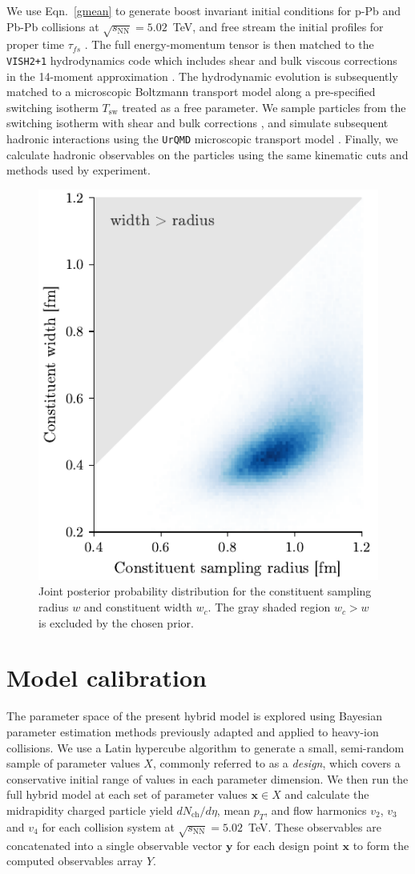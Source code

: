 \documentclass[3p,times,procedia,sort&compress]{elsarticle}
\newcommand{\sqrts}{\sqrt{s_\mathrm{NN}}}
\begin{document}
We use Eqn.~\eqref{gmean} to generate boost invariant initial conditions for p-Pb and Pb-Pb collisions at $\sqrts=5.02$~TeV, and free stream the initial profiles for proper time $\tau_{fs}$ \cite{Liu:2015nwa}.
The full energy-momentum tensor is then matched to the \texttt{VISH2+1} hydrodynamics code \cite{Song:2007ux, Shen:2014vra} which includes shear and bulk viscous corrections in the 14-moment approximation \cite{Bernhard:2016tnd}.
The hydrodynamic evolution is subsequently matched to a microscopic Boltzmann transport model along a pre-specified switching isotherm $T_\text{sw}$ treated as a free parameter.
We sample particles from the switching isotherm with shear and bulk corrections \cite{Bernhard:2018hnz}, and simulate subsequent hadronic interactions using the \texttt{UrQMD} microscopic transport model \cite{Bass:1998ca}.
Finally, we calculate hadronic observables on the particles using the same kinematic cuts and methods used by experiment.

\begin{figure}
  \includegraphics[width=.45\textwidth]{proton_posterior_shape}
  \caption{\label{fig:proton_shape} Joint posterior probability distribution for the constituent sampling radius $w$ and constituent width $w_c$. The gray shaded region $w_c > w$ is excluded by the chosen prior.}
\end{figure}

\section{Model calibration}

The parameter space of the present hybrid model is explored using Bayesian parameter estimation methods previously adapted and applied to heavy-ion collisions.
We use a Latin hypercube algorithm to generate a small, semi-random sample of parameter values $X$, commonly referred to as a \emph{design}, which covers a conservative initial range of values in each parameter dimension.
We then run the full hybrid model at each set of parameter values $\mathbf{x} \in X$ and calculate the midrapidity charged particle yield $dN_\text{ch}/d\eta$, mean $p_T$, and flow harmonics $v_2$, $v_3$ and $v_4$ for each collision system at $\sqrts=5.02$~TeV.
These observables are concatenated into a single observable vector $\mathbf{y}$ for each design point $\mathbf{x}$ to form the computed observables array $Y$.
\end{document}
